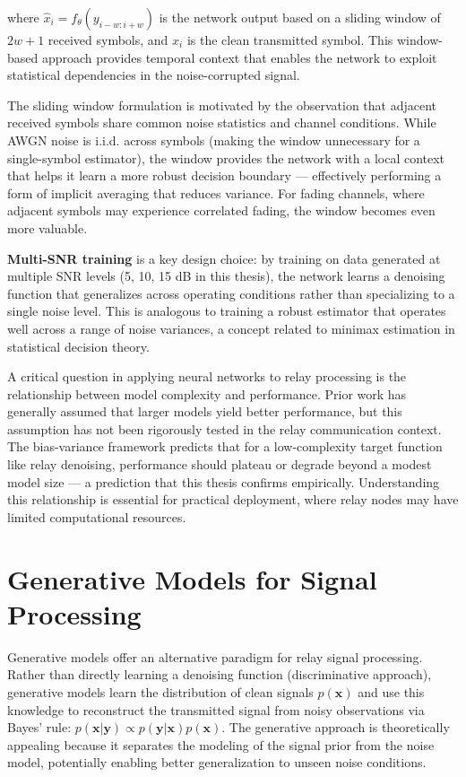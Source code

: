 \documentclass[
  english,
  12pt,
  12pt,
  a4paper,
  oneside]{report}
\begin{document}
where \(\hat{x}_i = f_\theta(y_{i-w:i+w})\) is the network output based on a sliding window of \(2w+1\) received symbols, and \(x_i\) is the clean transmitted symbol. This window-based approach provides temporal context that enables the network to exploit statistical dependencies in the noise-corrupted signal.

The sliding window formulation is motivated by the observation that adjacent received symbols share common noise statistics and channel conditions. While AWGN noise is i.i.d. across symbols (making the window unnecessary for a single-symbol estimator), the window provides the network with a local context that helps it learn a more robust decision boundary --- effectively performing a form of implicit averaging that reduces variance. For fading channels, where adjacent symbols may experience correlated fading, the window becomes even more valuable.

\textbf{Multi-SNR training} is a key design choice: by training on data generated at multiple SNR levels (5, 10, 15 dB in this thesis), the network learns a denoising function that generalizes across operating conditions rather than specializing to a single noise level. This is analogous to training a robust estimator that operates well across a range of noise variances, a concept related to minimax estimation in statistical decision theory.

A critical question in applying neural networks to relay processing is the relationship between model complexity and performance. Prior work has generally assumed that larger models yield better performance, but this assumption has not been rigorously tested in the relay communication context. The bias-variance framework predicts that for a low-complexity target function like relay denoising, performance should plateau or degrade beyond a modest model size --- a prediction that this thesis confirms empirically. Understanding this relationship is essential for practical deployment, where relay nodes may have limited computational resources.

\section{Generative Models for Signal Processing}\label{sec:generative-models-for-signal-processing}

Generative models offer an alternative paradigm for relay signal processing. Rather than directly learning a denoising function (discriminative approach), generative models learn the distribution of clean signals \(p(\mathbf{x})\) and use this knowledge to reconstruct the transmitted signal from noisy observations via Bayes' rule: \(p(\mathbf{x} | \mathbf{y}) \propto p(\mathbf{y} | \mathbf{x}) p(\mathbf{x})\). The generative approach is theoretically appealing because it separates the modeling of the signal prior from the noise model, potentially enabling better generalization to unseen noise conditions.
\end{document}
